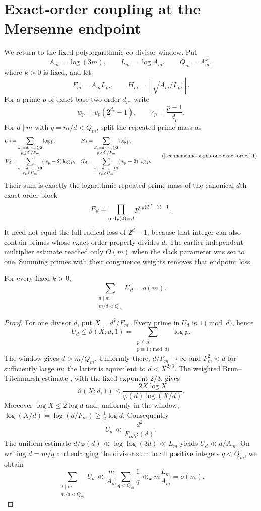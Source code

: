 \section{Exact-order coupling at the Mersenne endpoint}
\label{sec:mersenne-sigma-one-exact-order}

We return to the fixed polylogarithmic co-divisor window.  Put
\[
 A_m=\log(3m),\qquad L_m=\log A_m,\qquad Q_m=A_m^k,
\]
where $k>0$ is fixed, and let
\[
 F_m=A_mL_m,\qquad
 H_m=\left\lfloor\sqrt{A_m/L_m}\right\rfloor.
\]
For a prime $p$ of exact base-two order $d_p$, write
\[
 w_p=v_p(2^{d_p}-1),\qquad r_p=\frac{p-1}{d_p}.
\]
For $d\mid m$ with $q=m/d<Q_m$, split the repeated-prime mass as
\[
\begin{aligned}
 U_d&=\sum_{\substack{d_p=d,\ w_p\ge2\\p\le d^2/F_m}}\log p,&
 B_d&=\sum_{\substack{d_p=d,\ w_p\ge2\\p>d^2/F_m}}\log p,\\
 V_d&=\sum_{\substack{d_p=d,\ w_p\ge3\\r_p<H_m}}(w_p-2)\log p,&
 G_d&=\sum_{\substack{d_p=d,\ w_p\ge3\\r_p\ge H_m}}(w_p-2)\log p.
\end{aligned}
\tag{\ref{sec:mersenne-sigma-one-exact-order}.1}
\]
Their sum is exactly the logarithmic repeated-prime mass of the canonical
$d$th exact-order block
\[
 E_d=\prod_{\operatorname{ord}_p(2)=d}p^{v_p(2^d-1)-1}.
\]
It need not equal the full radical loss of $2^d-1$, because that integer can
also contain primes whose exact order properly divides $d$.  The
earlier independent multiplier estimate reached only $O(m)$ when the slack
parameter was set to one.  Summing primes with their congruence weights
removes that endpoint loss.

\begin{theorem}[The low one-copy arm at $\sigma=1$]
\label{thm:mersenne-sigma-one-low-one-copy}
For every fixed $k>0$,
\[
       \sum_{\substack{d\mid m\\m/d<Q_m}}U_d=o(m).
\]
\end{theorem}

\begin{proof}
For one divisor $d$, put $X=d^2/F_m$.  Every prime in $U_d$ is
$1\pmod d$, hence
\[
 U_d\le\vartheta(X;d,1)
 =\sum_{\substack{p\le X\\p\equiv1\pmod d}}\log p.
\]
The window gives $d>m/Q_m$.  Uniformly there, $d/F_m\to\infty$ and
$F_m^2<d$ for sufficiently large $m$; the latter is equivalent to
$d<X^{2/3}$.  The weighted Brun--Titchmarsh estimate
\cite[Theorem~2.4]{MurtySeguin2019}, with the fixed exponent $2/3$, gives
\[
 \vartheta(X;d,1)
 \le \frac{2X\log X}{\varphi(d)\log(X/d)}.
\]
Moreover $\log X\le2\log d$ and, uniformly in the window,
$\log(X/d)=\log(d/F_m)\ge\tfrac12\log d$.  Consequently
\[
 U_d\ll\frac{d^2}{F_m\varphi(d)}.
\]
The uniform estimate $d/\varphi(d)\ll\log\log(3d)\ll L_m$ yields
$U_d\ll d/A_m$.  On writing $d=m/q$ and enlarging the divisor sum to all
positive integers $q<Q_m$, we obtain
\[
 \sum_{\substack{d\mid m\\m/d<Q_m}}U_d
 \ll\frac m{A_m}\sum_{q<Q_m}\frac1q
 \ll_k m\frac{L_m}{A_m}=o(m).
\]
\end{proof}

